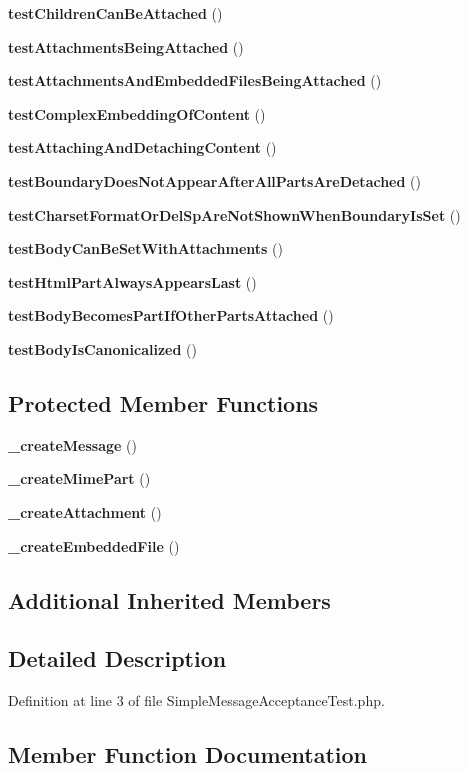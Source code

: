 \begin{DoxyCompactItemize}
\item 
{\bf test\+Children\+Can\+Be\+Attached} ()
\item 
{\bf test\+Attachments\+Being\+Attached} ()
\item 
{\bf test\+Attachments\+And\+Embedded\+Files\+Being\+Attached} ()
\item 
{\bf test\+Complex\+Embedding\+Of\+Content} ()
\item 
{\bf test\+Attaching\+And\+Detaching\+Content} ()
\item 
{\bf test\+Boundary\+Does\+Not\+Appear\+After\+All\+Parts\+Are\+Detached} ()
\item 
{\bf test\+Charset\+Format\+Or\+Del\+Sp\+Are\+Not\+Shown\+When\+Boundary\+Is\+Set} ()
\item 
{\bf test\+Body\+Can\+Be\+Set\+With\+Attachments} ()
\item 
{\bf test\+Html\+Part\+Always\+Appears\+Last} ()
\item 
{\bf test\+Body\+Becomes\+Part\+If\+Other\+Parts\+Attached} ()
\item 
{\bf test\+Body\+Is\+Canonicalized} ()
\end{DoxyCompactItemize}
\subsection*{Protected Member Functions}
\begin{DoxyCompactItemize}
\item 
{\bf \+\_\+create\+Message} ()
\item 
{\bf \+\_\+create\+Mime\+Part} ()
\item 
{\bf \+\_\+create\+Attachment} ()
\item 
{\bf \+\_\+create\+Embedded\+File} ()
\end{DoxyCompactItemize}
\subsection*{Additional Inherited Members}


\subsection{Detailed Description}


Definition at line 3 of file Simple\+Message\+Acceptance\+Test.\+php.



\subsection{Member Function Documentation}
